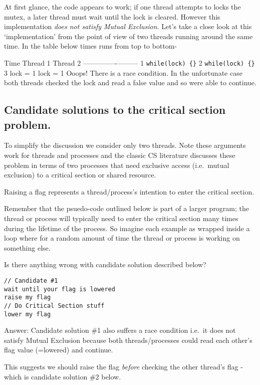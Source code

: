 At first glance, the code appears to work; if one thread attempts to
locks the mutex, a later thread must wait until the lock is cleared.
However this implementation \emph{does not satisfy Mutual Exclusion}.
Let's take a close look at this `implementation' from the point of view
of two threads running around the same time. In the table below times
runs from top to bottom-

Time \textbar{} Thread 1 \textbar{} Thread 2
-----\textbar{}----------\textbar{}--------- 1 \textbar{}
\texttt{while(lock)\ \{\}} 2 \textbar{} \textbar{}
\texttt{while(lock)\ \{\}} \textbar{} 3 \textbar{} lock = 1 \textbar{}
lock = 1 \textbar{} Ooops! There is a race condition. In the unfortunate
case both threads checked the lock and read a false value and so were
able to continue.

\subsection{Candidate solutions to the critical section
problem.}\label{candidate-solutions-to-the-critical-section-problem.}

To simplify the discussion we consider only two threads. Note these
arguments work for threads and processes and the classic CS literature
discusses these problem in terms of two processes that need exclusive
access (i.e.~mutual exclusion) to a critical section or shared resource.

Raising a flag represents a thread/process's intention to enter the
critical section.

Remember that the psuedo-code outlined below is part of a larger
program; the thread or process will typically need to enter the critical
section many times during the lifetime of the process. So imagine each
example as wrapped inside a loop where for a random amount of time the
thread or process is working on something else.

Is there anything wrong with candidate solution described below?

\begin{verbatim}
// Candidate #1
wait until your flag is lowered
raise my flag
// Do Critical Section stuff
lower my flag 
\end{verbatim}

Answer: Candidate solution \#1 also suffers a race condition i.e.~it
does not satisfy Mutual Exclusion because both threads/processes could
read each other's flag value (=lowered) and continue.

This suggests we should raise the flag \emph{before} checking the other
thread's flag - which is candidate solution \#2 below.

